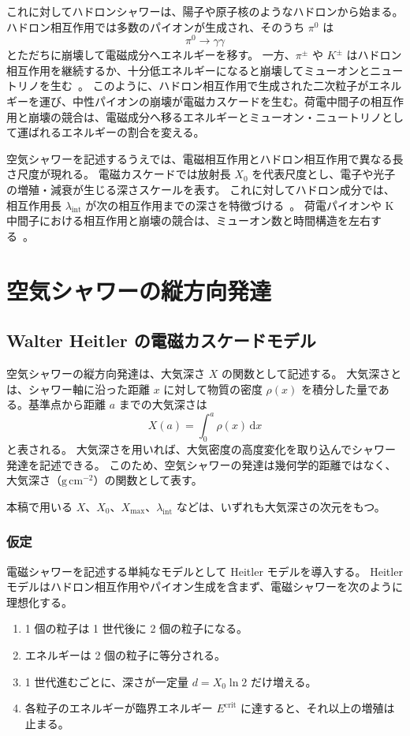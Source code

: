 \documentclass[book,paper=a4,fontsize=11pt]{jlreq}
\begin{document}
これに対してハドロンシャワーは、陽子や原子核のようなハドロンから始まる。
ハドロン相互作用では多数のパイオンが生成され、そのうち \(\pi^0\) は
\[
  \pi^0\to\gamma\gamma
\]
とただちに崩壊して電磁成分へエネルギーを移す。
一方、\(\pi^\pm\) や \(K^\pm\) はハドロン相互作用を継続するか、十分低エネルギーになると崩壊してミューオンとニュートリノを生む~\cite{Matthews2005,Montanus2013}。
このように、ハドロン相互作用で生成された二次粒子がエネルギーを運び、中性パイオンの崩壊が電磁カスケードを生む。荷電中間子の相互作用と崩壊の競合は、電磁成分へ移るエネルギーとミューオン・ニュートリノとして運ばれるエネルギーの割合を変える。

空気シャワーを記述するうえでは、電磁相互作用とハドロン相互作用で異なる長さ尺度が現れる。
電磁カスケードでは放射長 \(X_0\) を代表尺度とし、電子や光子の増殖・減衰が生じる深さスケールを表す。
これに対してハドロン成分では、相互作用長 \(\lambda_{\mathrm{int}}\) が次の相互作用までの深さを特徴づける~\cite{PDGPassage,PDGCosmicRays,Matthews2005}。
荷電パイオンや K 中間子における相互作用と崩壊の競合は、ミューオン数と時間構造を左右する~\cite{Matthews2005,Stanev2004}。

\section{空気シャワーの縦方向発達}\label{sec:longitudinal}
\subsection{Walter Heitler の電磁カスケードモデル}\label{subsec:heitler_em}
空気シャワーの縦方向発達は、大気深さ \(X\) の関数として記述する。
大気深さとは、シャワー軸に沿った距離 \(x\) に対して物質の密度 \(\rho(x)\) を積分した量である。基準点から距離 \(a\) までの大気深さは
\begin{equation}
  X(a) = \int_{0}^{a} \rho(x)\,\mathrm{d}x
\end{equation}
と表される。
大気深さを用いれば、大気密度の高度変化を取り込んでシャワー発達を記述できる。
このため、空気シャワーの発達は幾何学的距離ではなく、大気深さ（\(\mathrm{g\,cm^{-2}}\)）の関数として表す。

本稿で用いる \(X\)、\(X_0\)、\(X_{\max}\)、\(\lambda_{\mathrm{int}}\) などは、いずれも大気深さの次元をもつ。

\subsubsection{仮定}
電磁シャワーを記述する単純なモデルとして Heitler モデルを導入する。
Heitler モデルはハドロン相互作用やパイオン生成を含まず、電磁シャワーを次のように理想化する。
\begin{enumerate}
  \item 1 個の粒子は 1 世代後に 2 個の粒子になる。
  \item エネルギーは 2 個の粒子に等分される。
  \item 1 世代進むごとに、深さが一定量 \(d=X_0\ln 2\) だけ増える。
  \item 各粒子のエネルギーが臨界エネルギー \(E^\mathrm{crit}\) に達すると、それ以上の増殖は止まる。
\end{enumerate}
\end{document}
